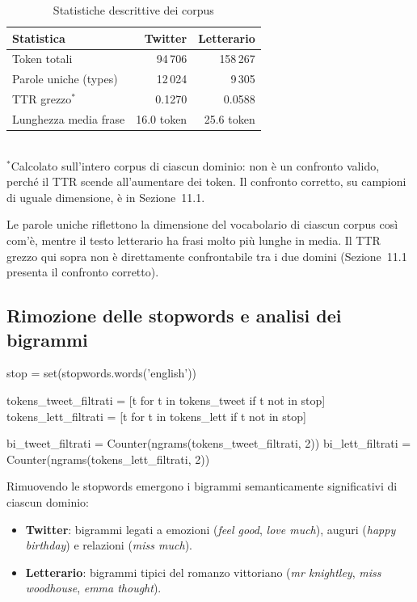 ﻿\documentclass[12pt,a4paper]{article}
\begin{document}
\begin{table}[H]
  \centering
  \caption{Statistiche descrittive dei corpus}
  \begin{tabular}{lrr}
    \toprule
    \textbf{Statistica} & \textbf{Twitter} & \textbf{Letterario} \\
    \midrule
    Token totali           & 94\,706 & 158\,267 \\
    Parole uniche (types)  & 12\,024 & 9\,305   \\
    TTR grezzo$^{*}$       & 0.1270  & 0.0588   \\
    Lunghezza media frase  & 16.0 token & 25.6 token \\
    \bottomrule
  \end{tabular}
  \\[0.3em]
  {\footnotesize $^{*}$Calcolato sull'intero corpus di ciascun dominio: non è un confronto valido, perché il TTR scende all'aumentare dei token. Il confronto corretto, su campioni di uguale dimensione, è in Sezione~11.1.}
\end{table}

Le parole uniche riflettono la dimensione del vocabolario di ciascun corpus così com'è, mentre il testo letterario ha frasi molto più lunghe in media. Il TTR grezzo qui sopra non è direttamente confrontabile tra i due domini (Sezione~11.1 presenta il confronto corretto).

\subsection{Rimozione delle stopwords e analisi dei bigrammi}

\begin{pylisting}[title={Rimozione stopwords e calcolo bigrammi/trigrammi}]
stop = set(stopwords.words('english'))

tokens_tweet_filtrati = [t for t in tokens_tweet if t not in stop]
tokens_lett_filtrati  = [t for t in tokens_lett  if t not in stop]

bi_tweet_filtrati = Counter(ngrams(tokens_tweet_filtrati, 2))
bi_lett_filtrati  = Counter(ngrams(tokens_lett_filtrati,  2))
\end{pylisting}

Rimuovendo le stopwords emergono i bigrammi semanticamente significativi di ciascun dominio:
\begin{itemize}
  \item \textbf{Twitter}: bigrammi legati a emozioni (\textit{feel good}, \textit{love much}), auguri (\textit{happy birthday}) e relazioni (\textit{miss much}).
  \item \textbf{Letterario}: bigrammi tipici del romanzo vittoriano (\textit{mr knightley}, \textit{miss woodhouse}, \textit{emma thought}).
\end{itemize}
\end{document}
